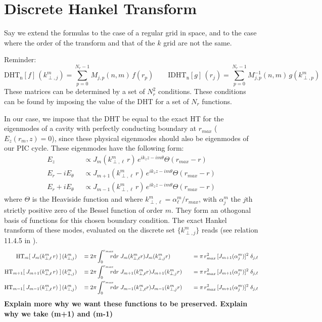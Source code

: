 \section{Discrete Hankel Transform}
\label{sec:HTMatrix}

Say we extend the formulas \cite{Guizar} to the case of a regular
grid in space, and to the case where the order of the transform and
that of the $k$ grid are not the same.

Reminder:
\[ \mathrm{DHT_n}[f] \,(k^m_{\perp,j}) = \sum_{p=0}^{N_r-1} M_{j,p}(n,m)
\,f(r_p) \qquad \mathrm{IDHT_n}[g] \, (r_j) = \sum_{p=0}^{N_r-1}
M^{-1}_{j,p}(n,m) \,g(k^m_{\perp,p}) \]
These matrices can be determined by a set of $N_r^2$ conditions. These
conditions can be found by imposing the value of the DHT for a set of  $N_r$ functions.

In our case, we impose that the DHT be equal to the exact HT for the eigenmodes of a cavity with
perfectly conducting boundary at $r_{max}$ ($E_z(r_{m},z) =
0$), since these physical eigenmodes should also be eigenmodes of our
PIC cycle. These eigenmodes have the following form:
\begin{align*}
E_z \;& \; \propto  J_m(k^m_{\perp,\ell} \,r)\,e^{ik_z z -im\theta} \Theta(r_{max}-r) \\
E_r -i E_\theta \;& \; \propto  J_{m+1}(k^m_{\perp,\ell} \,r) \,e^{ik_z z -im\theta} \Theta(r_{max}-r)\\
E_r +i E_\theta \;& \; \propto  J_{m-1}(k^m_{\perp,\ell} \,r) \,e^{ik_z z -im\theta} \Theta(r_{max}-r) 
\end{align*}
where $\Theta$ is the Heaviside function and where $k^m_{\perp,\ell} =
\alpha^m_\ell / r_{max}$, with $\alpha^m_j$ the $j$th strictly positive zero of
the Bessel function of order $m$. They form an othogonal basis of
functions for this chosen boundary condition. The exact Hankel transform of these modes, evaluated on the discrete set $\{
k^m_{\perp,j} \}$ reads (see relation 11.4.5 in \cite{Abramowitz}).
\begin{align*} 
\mathrm{HT}_{m}[ \; J_m(k^m_{\perp,\ell} \,r) \;] \,(k^m_{\perp,j} )
&\quad \equiv 2\pi \rInteg \; J_m (k^m_{\perp,\ell} r) J_m (k^m_{\perp,j} r)
&\quad = \pi\, r_{max}^2\,[ J_{m+1}(\alpha_j^m)]^2 \; \delta_{j,\ell} \\
\mathrm{HT}_{m+1}[ \; J_{m+1}(k^m_{\perp,\ell} \,r) \;] \,(k^m_{\perp,j} )
&\quad \equiv 2\pi \rInteg \; J_{m+1} (k^m_{\perp,\ell} r)
  J_{m+1}(k^m_{\perp,j} r) 
&\quad = \pi\, r_{max}^2\,[ J_{m+1}(\alpha_j^m)]^2 \; \delta_{j,\ell} \\
\mathrm{HT}_{m-1}[ \; J_{m-1}(k^m_{\perp,\ell} \,r) \;] \,(k^m_{\perp,j} )
& \quad \equiv 2\pi \rInteg \; J_{m-1} (k^m_{\perp,\ell} r) J_{m-1} (k^m_{\perp,j}
  r) 
&\quad = \pi\, r_{max}^2\,[ J_{m+1}(\alpha_j^m)]^2 \; \delta_{j,\ell}
\end{align*}
\textbf{Explain more why we want these functions to be
  preserved. Explain why we take (m+1) and (m-1)}

